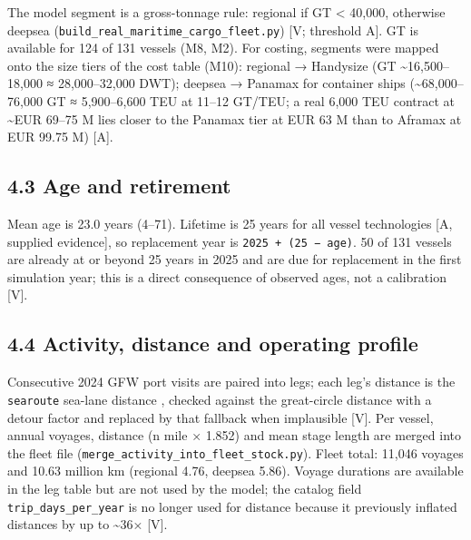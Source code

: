 \documentclass[11pt,a4paper]{article}
\begin{document}
The model segment is a gross-tonnage rule: regional if GT \textless{} 40,000, otherwise deepsea (\texttt{build\_\allowbreak{}real\_\allowbreak{}maritime\_\allowbreak{}cargo\_\allowbreak{}fleet.\allowbreak{}py}) [V; threshold A]. GT is available for 124 of 131 vessels (M8, M2). For costing, segments were mapped onto the size tiers of the cost table (M10): regional → Handysize (GT \textasciitilde{}16,500–18,000 ≈ 28,000–32,000 DWT); deepsea → Panamax for container ships (\textasciitilde{}68,000–76,000 GT ≈ 5,900–6,600 TEU at 11–12 GT/TEU; a real 6,000 TEU contract at \textasciitilde{}EUR 69–75 M lies closer to the Panamax tier at EUR 63 M than to Aframax at EUR 99.75 M) [A].

\subsection*{4.3 Age and retirement}

Mean age is 23.0 years (4–71). Lifetime is 25 years for all vessel technologies [A, supplied evidence], so replacement year is \texttt{2025 + (25 − age)}. 50 of 131 vessels are already at or beyond 25 years in 2025 and are due for replacement in the first simulation year; this is a direct consequence of observed ages, not a calibration [V].

\subsection*{4.4 Activity, distance and operating profile}

Consecutive 2024 GFW port visits are paired into legs; each leg's distance is the \texttt{searoute} sea-lane distance \citep{searoute}, checked against the great-circle distance with a detour factor and replaced by that fallback when implausible [V]. Per vessel, annual voyages, distance (n mile × 1.852) and mean stage length are merged into the fleet file (\texttt{merge\_\allowbreak{}activity\_\allowbreak{}into\_\allowbreak{}fleet\_\allowbreak{}stock.\allowbreak{}py}). Fleet total: 11,046 voyages and 10.63 million km (regional 4.76, deepsea 5.86). Voyage durations are available in the leg table but are not used by the model; the catalog field \texttt{trip\_\allowbreak{}days\_\allowbreak{}per\_\allowbreak{}year} is no longer used for distance because it previously inflated distances by up to \textasciitilde{}36× [V].
\end{document}
